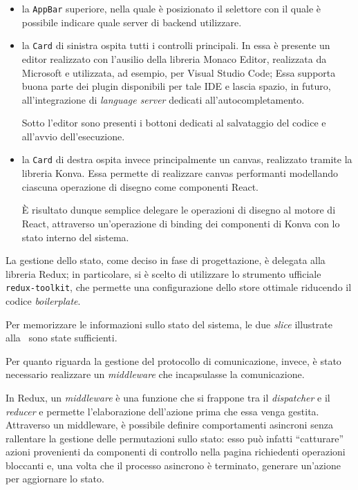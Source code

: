     \begin{itemize}
      \item
        la \texttt{AppBar} superiore, nella quale è posizionato il selettore con il quale è possibile indicare quale server di backend utilizzare.
      \item
        la \texttt{Card} di sinistra ospita tutti i controlli principali.
        In essa è presente un editor realizzato con l'ausilio della libreria Monaco Editor, realizzata da Microsoft e utilizzata, ad esempio, per Visual Studio Code;
        Essa supporta buona parte dei plugin disponibili per tale IDE e lascia spazio, in futuro, all'integrazione di \emph{language server} dedicati all'autocompletamento.

        Sotto l'editor sono presenti i bottoni dedicati al salvataggio del codice e all'avvio dell'esecuzione.
      \item
        la \texttt{Card} di destra ospita invece principalmente un canvas, realizzato tramite la libreria Konva.
        Essa permette di realizzare canvas performanti modellando ciascuna operazione di disegno come componenti React.

        È risultato dunque semplice delegare le operazioni di disegno al motore di React, attraverso un'operazione di binding dei componenti di Konva con lo stato interno del sistema.
    \end{itemize}

    La gestione dello stato, come deciso in fase di progettazione, è delegata alla libreria Redux;
    in particolare, si è scelto di utilizzare lo strumento ufficiale \texttt{redux-toolkit}, che permette una configurazione dello store ottimale riducendo il codice \emph{boilerplate}.

    Per memorizzare le informazioni sullo stato del sistema, le due \emph{slice} illustrate alla~ sono state sufficienti.

    Per quanto riguarda la gestione del protocollo di comunicazione, invece, è stato necessario realizzare un \emph{middleware} che incapsulasse la comunicazione.

    In Redux, un \emph{middleware} è una funzione che si frappone tra il \emph{dispatcher} e il \emph{reducer} e permette l'elaborazione dell'azione prima che essa venga gestita.
    Attraverso un middleware, è possibile definire comportamenti asincroni senza rallentare la gestione delle permutazioni sullo stato:
    esso può infatti ``catturare'' azioni provenienti da componenti di controllo nella pagina richiedenti operazioni bloccanti e, una volta che il processo asincrono è terminato, generare un'azione per aggiornare lo stato.

